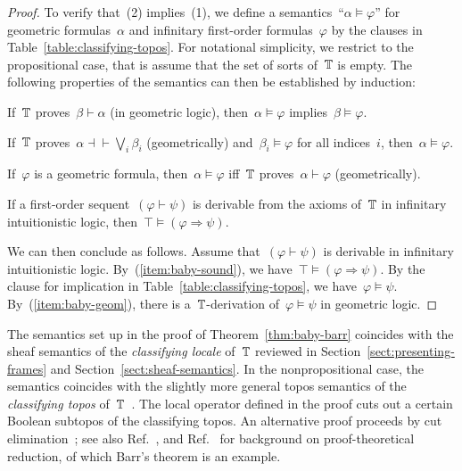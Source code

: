 \documentclass{ws-rv9x6}
\begin{document}
{\begin{proof}
To verify that~(2) implies~(1), we define a semantics~``$\alpha \models
\varphi$'' for geometric formulas~$\alpha$ and infinitary first-order
formulas~$\varphi$ by the clauses in Table~\ref{table:classifying-topos}. For
notational simplicity, we restrict to the propositional case, that is assume that the set of
sorts of~$\mathbb{T}$ is empty.
The following properties of the semantics can then be established by induction:
\begin{alphlist}[(d)]
\item If~$\mathbb{T}$ proves~$\beta \vdash \alpha$ (in geometric logic), then~$\alpha \models \varphi$ implies~$\beta
\models \varphi$.
\item If~$\mathbb{T}$ proves~$\alpha \dashv\vdash \bigvee_i \beta_i$ (geometrically) and~$\beta_i \models \varphi$ for
all indices~$i$, then~$\alpha \models \varphi$.
\item\label{item:baby-geom} If~$\varphi$ is a geometric formula, then~$\alpha
\models \varphi$ iff~$\mathbb{T}$ proves~$\alpha \vdash \varphi$ (geometrically).
\item\label{item:baby-sound} If a first-order sequent~$(\varphi \vdash \psi)$
is derivable from the axioms of~$\mathbb{T}$ in infinitary intuitionistic logic,
then~$\top \models (\varphi \Rightarrow \psi)$.
\end{alphlist}
We can then conclude as follows. Assume that~$(\varphi \vdash \psi)$
is derivable in infinitary intuitionistic logic. By~(\ref{item:baby-sound}), we
have~$\top \models (\varphi \Rightarrow \psi)$. By the clause for implication
in Table~\ref{table:classifying-topos}, we have~$\varphi \models \psi$.
By~(\ref{item:baby-geom}), there is a~$\mathbb{T}$-derivation of~$\varphi \models
\psi$ in geometric logic.
\end{proof}

\begin{remark}The semantics set up in the proof of Theorem~\ref{thm:baby-barr}
coincides with the sheaf semantics of the \emph{classifying locale} of~$\mathbb{T}$
reviewed in Section~\ref{sect:presenting-frames} and
Section~\ref{sect:sheaf-semantics}. In the nonpropositional case, the semantics
coincides with the slightly more general topos semantics of the
\emph{classifying topos} of~$\mathbb{T}$~\cite[Section~2]{caramello:tst}. The local
operator defined in the proof cuts out a certain Boolean subtopos of the
classifying topos. An alternative proof proceeds by cut
elimination~\cite[Section~6]{rathjen:barr}; see also
Ref.~, and
Ref.~ for background on proof-theoretical
reduction, of which Barr's theorem is an example.
\end{remark}

}
\end{document}
